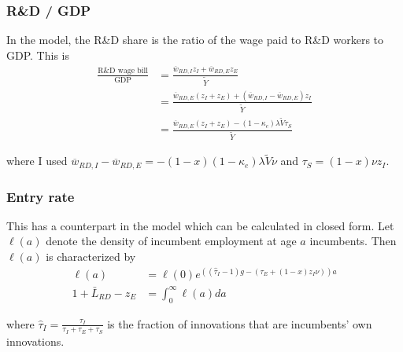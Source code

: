 \documentclass[11pt,english]{article}
\theoremstyle{remark}
\begin{document}
\subsubsection{R\&D / GDP} 

In the model, the R\&D share is the ratio of the wage paid to R\&D workers to GDP. This is
\begin{align*}
\frac{\textrm{R\&D wage bill}}{\textrm{GDP}} &= \frac{\overline{w}_{RD,I} z_I + \overline{w}_{RD,E} z_E}{\tilde{Y}} \\ 
&= \frac{\overline{w}_{RD,E} (z_I + z_E) + (\overline{w}_{RD,I} - \overline{w}_{RD,E})z_I}{\tilde{Y}} \\
&= \frac{\overline{w}_{RD,E} (z_I + z_E) - (1-\kappa_e) \lambda \tilde{V} \tau_S}{\tilde{Y}}
\end{align*}

where I used $\overline{w}_{RD,I} - \overline{w}_{RD,E} = -(1-x)(1-\kappa_e) \lambda \tilde{V} \nu$ and $\tau_S = (1-x)\nu z_I$. 

\subsubsection{Entry rate}

This has a counterpart in the model which can be calculated in closed form. Let $\ell(a)$ denote the density of incumbent employment at age $a$ incumbents. Then $\ell(a)$ is characterized by 
\begin{align*}
\ell(a) &= \ell(0)e^{((\hat{\tau}_I -1)g - (\tau_E + (1-x)z_I \nu))a}  \\
1 + \bar{L}_{RD} - z_E &= \int_0^{\infty} \ell(a) da
\end{align*}

where $\hat{\tau}_I = \frac{\tau_I}{\tau_I + \tau_E + \tau_S}$ is the fraction of innovations that are incumbents' own innovations. 
\end{document}
